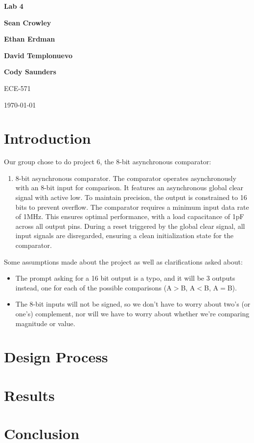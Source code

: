 \documentclass{article}
\begin{document}
\begin{titlepage}
	\centering
	\vspace*{\fill}

	\huge
	\textbf{Lab 4}

	\vspace{1cm}
	\Large

	\textbf{Sean Crowley}

	\textbf{Ethan Erdman}

	\textbf{David Templonuevo}

	\textbf{Cody Saunders}

	\vspace{0.5cm}
	ECE-571

	\vspace{0.5cm}
	\today

	\vspace*{\fill}
\end{titlepage}

\section*{Introduction}

\noindent Our group chose to do project 6, the 8-bit asynchronous comparator:

\begin{enumerate}[start=6]
	\item 8-bit asynchronous comparator. The comparator operates asynchronously with an 8-bit input for comparison. It features an asynchronous global clear signal with active low. To maintain precision, the output is constrained to 16 bits to prevent overflow. The comparator requires a minimum input data rate of 1MHz. This ensures optimal performance, with a load capacitance of 1pF across all output pins. During a reset triggered by the global clear signal, all input signals are disregarded, ensuring a clean initialization state for the comparator.
\end{enumerate}

\noindent Some assumptions made about the project as well as clarifications asked about:

\begin{itemize}
	\item The prompt asking for a 16 bit output is a typo, and it will be 3 outputs instead, one for each of the possible comparisons (A$>$B, A$<$B, A$=$B).
	\item The 8-bit inputs will not be signed, so we don't have to worry about two's (or one's) complement, nor will we have to worry about whether we're comparing magnitude or value.
\end{itemize}


\section*{Design Process}

\section*{Results}

\section*{Conclusion}
\end{document}
